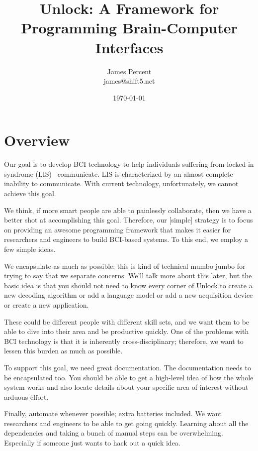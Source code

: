 \documentclass[11pt]{article}
\begin{document}
\title{\textbf{Unlock: A Framework for Programming Brain-Computer Interfaces}}
\author{James Percent \\
james@shift5.net}
\date{\today}
\parskip 11pt
\parindent 0pt
\maketitle
\tableofcontents
\section{Overview}\label{overviewsec}

Our goal is to develop BCI technology to help individuals suffering from locked-in syndrome (LIS)~\cite{lis} communicate.  LIS is characterized by an almost complete inability to communicate.  With current technology, unfortunately, we cannot achieve this goal.

We think, if more smart people are able to painlessly collaborate, then we have a better shot at accomplishing this goal.  Therefore, our [simple] strategy is to focus on providing an awesome programming framework that makes it easier for researchers and engineers to build BCI-based systems.  To this end, we employ a few simple ideas.  

We encapsulate as much as possible; this is kind of technical mumbo jumbo for trying to say that we separate concerns.  We'll talk more about this later, but the basic idea is that you should not need to know every corner of Unlock to create a new decoding algorithm or add a language model or add a new acquisition device or create a new application.  

These could be different people with different skill sets, and we want them to be able to dive into their area and be productive quickly.  One of the problems with BCI technology is that it is inherently cross-disciplinary; therefore, we want to lessen this burden as much as possible.

To support this goal, we need great documentation.  The documentation needs to be encapsulated too.  You should be able to get a high-level idea of how the whole system works and also locate details about your specific area of interest without arduous effort.  

Finally, automate whenever possible; extra batteries included.  We want researchers and engineers to be able to get going quickly.  Learning about all the dependencies and taking a bunch of manual steps can be overwhelming.  Especially if someone just wants to hack out a quick idea.  
\end{document}
